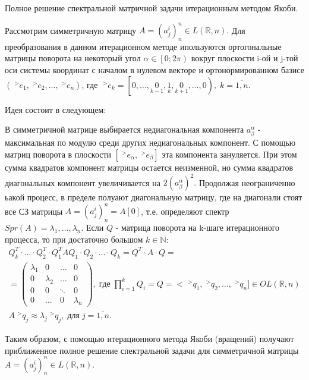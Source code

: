 \documentclass[__main__.tex]{subfiles}
\begin{document}
Полное решение спектральной матричной задачи итерационным методом Якоби.

Рассмотрим симметричную матрицу $A = \left(a^i_j\right)^n_n\in L\left(\mathbb{R},n\right).$ Для преобразования в данном итерационном методе ипользуются ортогональные матрицы поворота на некоторый угол $\alpha\in\left[0;2\pi\right)$ вокруг плоскости i-ой и j-той оси системы координат с началом в нулевом векторе и ортонормированном базисе $\left(\;^{>}e_1,\;^{>}e_2,\dots,\;^{>}e_n\right)$, где $\;^{>}e_k=\left[0,\dots,\underset{k-1}{0},\underset{k}{1},\underset{k+1}{0},\dots,0\right),\;k=\overline{1,n}.$

Идея состоит в следующем:

В симметричной матрице выбирается недиагональная компонента $a^\alpha_\beta$ - максимальная по модулю среди других недиагональных компонент. С помощью матриц поворота в плоскости $\left[\;^{>}e_\alpha,\;^{>}e_\beta\right]$ эта компонента зануляется. При этом сумма квадратов компонент матрицы остается неизменной, но сумма квадратов диагональных компонент увеличивается на $2\left(a^\alpha_\beta\right)^2.$ Продолжая неограниченно ьакой процесс, в пределе полуают диагональную матрицу, где на диагонали стоят все СЗ матрицы $A = \left(a^i_j\right)^n_n = A[0]$, т.е. определяют спектр $Spr(A)={\lambda_1,\dots,\lambda_n}.$ Если $Q$ - матрица поворота на k-шаге итерационного процесса, то при достаточно большом $k\in\mathbb{N}:$
\begin{gather*}
	Q^T_k\cdot...\cdot Q^T_2\cdot Q^T_1AQ_1\cdot Q_2\cdot...\cdot Q_k=Q^T\cdot A\cdot Q = \\
=	\begin{pmatrix}
		\lambda_1 & 0 & \dots & 0 \\
		0 & \lambda_2 & \dots & 0 \\
		0 & 0 & \ddots & 0 \\
		0 & \dots & 0 & \lambda_n
	\end{pmatrix},\;где\; \prod\limits_{i=1}^kQ_i=Q=<\;^{>}q_1,\;^{>}q_2,\dots,\;^{>}q_n]\in OL\left(\mathbb R,n\right)\\
	A\;^{>}q_j\approx \lambda_j\;^{>}q_j,\;для\;j=\overline{1,n}.
\end{gather*}

Таким образом, с помощью итерационного метода Якоби (вращений) получают приближенное полное решение спектральной задачи для симметричной матрицы $A=\left(a^i_j\right)^n_n\in L\left(\mathbb R,n\right).$\\
\end{document}
